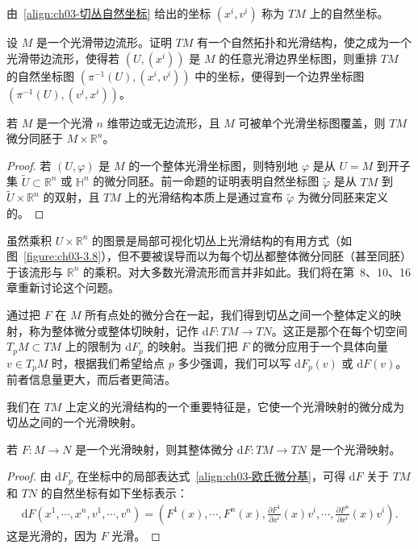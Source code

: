 \documentclass[../../main.tex]{subfiles}
\begin{document}
由~\eqref{align:ch03-切丛自然坐标} 给出的坐标 $(x^{i},v^{i})$ 称为 $TM$ 上的自然坐标。

\begin{exercise}\label{exercise:ch03-3.19}
设 $M$ 是一个光滑带边流形。证明 $TM$ 有一个自然拓扑和光滑结构，使之成为一个光滑带边流形，使得若 $(U,(x^{i}))$ 是 $M$ 的任意光滑边界坐标图，则重排 $TM$ 的自然坐标图 $(\pi^{-1}(U),(x^{i},v^{i}))$ 中的坐标，便得到一个边界坐标图 $(\pi^{-1}(U),(v^{i},x^{i}))$。
\end{exercise}

\begin{proposition}\label{proposition:ch03-单图覆盖切丛}
若 $M$ 是一个光滑 $n$ 维带边或无边流形，且 $M$ 可被单个光滑坐标图覆盖，则 $TM$ 微分同胚于 $M\times\mathbb{R}^{n}$。
\end{proposition}

\begin{proof}
若 $(U,\varphi)$ 是 $M$ 的一个整体光滑坐标图，则特别地 $\varphi$ 是从 $U=M$ 到开子集 $\widetilde{U}\subset\mathbb{R}^{n}$ 或 $\mathbb{H}^{n}$ 的微分同胚。前一命题的证明表明自然坐标图 $\widetilde{\varphi}$ 是从 $TM$ 到 $\widetilde{U}\times\mathbb{R}^{n}$ 的双射，且 $TM$ 上的光滑结构本质上是通过宣布 $\widetilde{\varphi}$ 为微分同胚来定义的。
\end{proof}

虽然乘积 $U\times\mathbb{R}^{n}$ 的图景是局部可视化切丛上光滑结构的有用方式（如图~\cref{figure:ch03-3.8}），但不要被误导而以为每个切丛都整体微分同胚（甚至同胚）于该流形与 $\mathbb{R}^{n}$ 的乘积。对大多数光滑流形而言并非如此。我们将在第~8、10、16 章重新讨论这个问题。

通过把 $F$ 在 $M$ 所有点处的微分合在一起，我们得到切丛之间一个整体定义的映射，称为整体微分或整体切映射，记作 $\mathrm{d}F:TM\to TN$。这正是那个在每个切空间 $T_{p}M\subset TM$ 上的限制为 $\mathrm{d}F_{p}$ 的映射。当我们把 $F$ 的微分应用于一个具体向量 $v\in T_{p}M$ 时，根据我们希望给点 $p$ 多少强调，我们可以写 $\mathrm{d}F_{p}(v)$ 或 $\mathrm{d}F(v)$。前者信息量更大，而后者更简洁。

我们在 $TM$ 上定义的光滑结构的一个重要特征是，它使一个光滑映射的微分成为切丛之间的一个光滑映射。

\begin{proposition}\label{proposition:ch03-整体微分光滑}
若 $F:M\to N$ 是一个光滑映射，则其整体微分 $\mathrm{d}F:TM\to TN$ 是一个光滑映射。
\end{proposition}

\begin{proof}
由 $\mathrm{d}F_{p}$ 在坐标中的局部表达式~\eqref{align:ch03-欧氏微分基}，可得 $\mathrm{d}F$ 关于 $TM$ 和 $TN$ 的自然坐标有如下坐标表示：
\begin{align*}
\mathrm{d}F(x^{1},\cdots ,x^{n},v^{1},\cdots ,v^{n})
=\left(F^{1}(x),\cdots ,F^{n}(x),\frac{\partial F^{1}}{\partial x^{i}}(x)v^{i},\cdots ,\frac{\partial F^{n}}{\partial x^{i}}(x)v^{i}\right).
\end{align*}
这是光滑的，因为 $F$ 光滑。
\end{proof}
\end{document}
